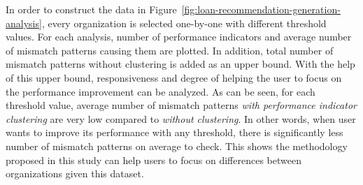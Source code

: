 In order to construct the data in Figure~\ref{fig:loan-recommendation-generation-analysis}, every organization is selected one-by-one with different threshold values. For each analysis, number of performance indicators and average number of mismatch patterns causing them are plotted. In addition, total number of mismatch patterns without clustering is added as an upper bound. With the help of this upper bound, responsiveness and degree of helping the user to focus on the performance improvement can be analyzed. As can be seen, for each threshold value, average number of mismatch patterns \textit{with performance indicator clustering} are very low compared to \textit{without clustering}. In other words, when user wants to improve its performance with any threshold, there is significantly less number of mismatch patterns on average to check. This shows the methodology proposed in this study can help users to focus on differences between organizations given this dataset.